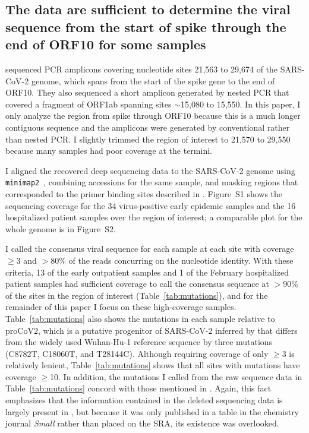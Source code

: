 \documentclass[9pt,twocolumn,twoside]{gsajnl_modified}
\begin{document}
\subsection{The data are sufficient to determine the viral sequence from the start of spike through the end of ORF10 for some samples}
\citet{wang2020medRxiv} sequenced PCR amplicons covering nucleotide sites 21,563 to 29,674 of the SARS-CoV-2 genome, which spans from the start of the spike gene to the end of ORF10.
They also sequenced a short amplicon generated by nested PCR that covered a fragment of ORF1ab spanning sites $\sim$15,080 to 15,550.
In this paper, I only analyze the region from spike through ORF10 because this is a much longer contiguous sequence and the amplicons were generated by conventional rather than nested PCR.
I slightly trimmed the region of interest to 21,570 to 29,550 because many samples had poor coverage at the termini.

I aligned the recovered deep sequencing data to the SARS-CoV-2 genome using \texttt{minimap2}~\citep{li2018minimap2}, combining accessions for the same sample, and masking regions that corresponded to the primer binding sites described in \citet{wang2020medRxiv}.
Figure~S1 shows the sequencing coverage for the 34 virus-positive early epidemic samples and the 16 hospitalized patient samples over the region of interest; a comparable plot for the whole genome is in Figure~S2.

I called the consensus viral sequence for each sample at each site with coverage $\ge$3 and $>$80\% of the reads concurring on the nucleotide identity.
With these criteria, 13 of the early outpatient samples and 1 of the February hospitalized patient samples had sufficient coverage to call the consensus sequence at $>$90\% of the sites in the region of interest (Table~\ref{tab:mutations}), and for the remainder of this paper I focus on these high-coverage samples.
Table~\ref{tab:mutations} also shows the mutations in each sample relative to proCoV2, which is a putative progenitor of SARS-CoV-2 inferred by \citet{kumar2021evolutionary} that differs from the widely used Wuhan-Hu-1 reference sequence by three mutations (C8782T, C18060T, and T28144C).
Although requiring coverage of only $\ge$3 is relatively lenient, Table~\ref{tab:mutations} shows that all sites with mutations have coverage $\ge$10.
In addition, the mutations I called from the raw sequence data in Table~\ref{tab:mutations} concord with those mentioned in \citet{wang2020small}.
Again, this fact emphasizes that the information contained in the deleted sequencing data is largely present in \citet{wang2020small}, but because it was only published in a table in the chemistry journal \textit{Small} rather than placed on the SRA, its existence was overlooked.
\end{document}
